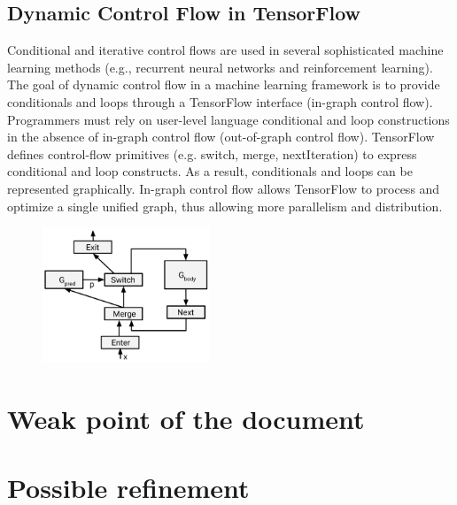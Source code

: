 \documentclass[acmlarge]{acmart}
\begin{document}
\subsection{Dynamic Control Flow in TensorFlow}
Conditional and iterative control flows are used in several sophisticated machine learning methods (e.g., recurrent neural networks and reinforcement learning). The goal of dynamic control flow in a machine learning framework is to provide conditionals and loops through a TensorFlow interface (in-graph control flow). Programmers must rely on user-level language conditional and loop constructions in the absence of in-graph control flow (out-of-graph control flow). TensorFlow defines control-flow primitives (e.g. switch, merge, nextIteration) to express conditional and loop constructs. As a result, conditionals and loops can be represented graphically. In-graph control flow allows TensorFlow to process and optimize a single unified graph, thus allowing more parallelism and distribution.
\begin{figure}[htbp]
  \centering
  \includegraphics[width=5cm]{./primitive.png}
\end{figure}
\section{Weak point of the document}
\subsection{}
\section{Possible refinement}



\end{document}
